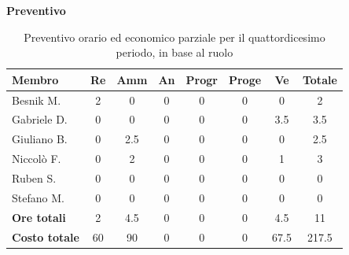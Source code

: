 \documentclass[a4paper,10pt]{article}
\begin{document}
\textbf{Preventivo} \\
\begin{table}[H]
  \centering
  \begin{tabular}{|l|c|c|c|c|c|c|c|}
    \hline
    \textbf{Membro} & \textbf{Re} & \textbf{Amm} & \textbf{An} & \textbf{Progr} & \textbf{Proge} & \textbf{Ve} & \textbf{Totale} \\
    \hline
    Besnik M.   & 2 & 0 & 0 & 0   & 0 & 0   & 2  \\
    Gabriele D. & 0 & 0 & 0 & 0   & 0 & 3.5   & 3.5  \\
    Giuliano B. & 0 & 2.5 & 0 & 0   & 0 & 0   & 2.5  \\
    Niccolò F.  & 0 & 2 & 0 & 0   & 0 & 1   & 3  \\
    Ruben S.    & 0 & 0 & 0 & 0   & 0 & 0   & 0 \\
    Stefano M.  & 0 & 0 & 0 & 0   & 0 & 0   & 0  \\
    \hline
    \textbf{Ore totali} & 2  & 4.5 & 0 & 0  & 0 & 4.5 & 11 \\
    \hline
    \textbf{Costo totale} & 60 & 90 & 0 & 0  & 0  & 67.5 & 217.5 \\
    \hline
  \end{tabular}
  \caption{Preventivo orario ed economico parziale per il quattordicesimo periodo, in base al ruolo}
\end{table}
\end{document}
